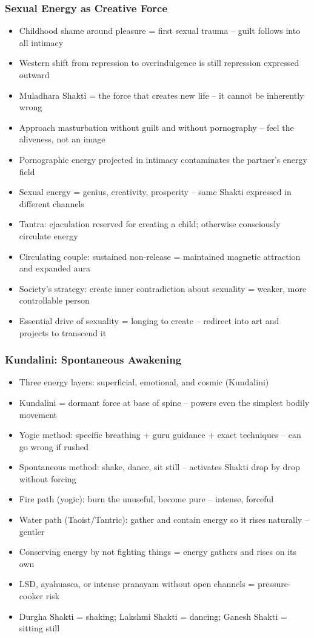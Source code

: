 \begin{frame}[fragile]\frametitle{Sexual Energy as Creative Force}
  \begin{itemize}
    \item Childhood shame around pleasure = first sexual trauma -- guilt follows into all intimacy
    \item Western shift from repression to overindulgence is still repression expressed outward
    \item Muladhara Shakti = the force that creates new life -- it cannot be inherently wrong
    \item Approach masturbation without guilt and without pornography -- feel the aliveness, not an image
    \item Pornographic energy projected in intimacy contaminates the partner's energy field
    \item Sexual energy = genius, creativity, prosperity -- same Shakti expressed in different channels
    \item Tantra: ejaculation reserved for creating a child; otherwise consciously circulate energy
    \item Circulating couple: sustained non-release = maintained magnetic attraction and expanded aura
    \item Society's strategy: create inner contradiction about sexuality = weaker, more controllable person
    \item Essential drive of sexuality = longing to create -- redirect into art and projects to transcend it
  \end{itemize}
\end{frame}

\begin{frame}[fragile]\frametitle{Kundalini: Spontaneous Awakening}
  \begin{itemize}
    \item Three energy layers: superficial, emotional, and cosmic (Kundalini)
    \item Kundalini = dormant force at base of spine -- powers even the simplest bodily movement
    \item Yogic method: specific breathing + guru guidance + exact techniques -- can go wrong if rushed
    \item Spontaneous method: shake, dance, sit still -- activates Shakti drop by drop without forcing
    \item Fire path (yogic): burn the unuseful, become pure -- intense, forceful
    \item Water path (Taoist/Tantric): gather and contain energy so it rises naturally -- gentler
    \item Conserving energy by not fighting things = energy gathers and rises on its own
    \item LSD, ayahuasca, or intense pranayam without open channels = pressure-cooker risk
    \item Durgha Shakti = shaking; Lakshmi Shakti = dancing; Ganesh Shakti = sitting still
  \end{itemize}
\end{frame}

